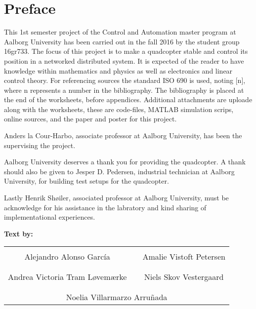 
\chapter*{Preface}
This 1st semester project of the Control and Automation master program at Aalborg University has been carried out in the fall 2016 by the student group 16gr733. 
The focus of this project is to make a quadcopter stable and control its position in a networked distributed system. 
It is expected of the reader to have knowledge within mathematics and physics as well as electronics and linear control theory.
For referencing sources the standard ISO 690 is used, noting [n], where n represents a number in the bibliography. The bibliography is placed at the end of the worksheets, before appendices. Additional attachments are uploade along with the worksheets, these are code-files, MATLAB simulation scrips, online sources, and the paper and poster for this project.   

Anders la Cour-Harbo, associate professor at Aalborg University, has been the supervising the project. 

Aalborg University deserves a thank you for providing the quadcopter. A thank should also be given to Jesper D. Pedersen, industrial technician at Aalborg University, for building test setups for the quadcopter. 

Lastly Henrik Shøiler, associated professor at Aalborg University, must be acknowledge for his assistance in the labratory and kind sharing of implementational experiences.

\textbf{Text by:}\\
\vspace{-5pt}
\begin{table}[H]
	\centering
		\begin{tabular}{c c c}
			\underline{\phantom{JAERJAERJAERJAERGO}} & \phantom{cookies} & \underline{\phantom{JAERJAERJAERJAERGO}} \\
			Alejandro Alonso García			& \phantom{cookies} & Amalie Vistoft Petersen		\\
			&&\\
			\underline{\phantom{JAERJAERJAERJAERGO}} & \phantom{cookies} & \underline{\phantom{JAERJAERJAERJAERGO}} \\
			Andrea Victoria Tram Løvemærke			& \phantom{cookies} & Niels Skov Vestergaard		\\
			&&\\
	    \multicolumn{3}{c}{\underline{\phantom{JAERJAERJAERJAERGO}}}\\
	    \multicolumn{3}{c}{Noelia Villarmarzo Arruñada}\\				
		\end{tabular}
\end{table}

\pagebreak
\restoregeometry